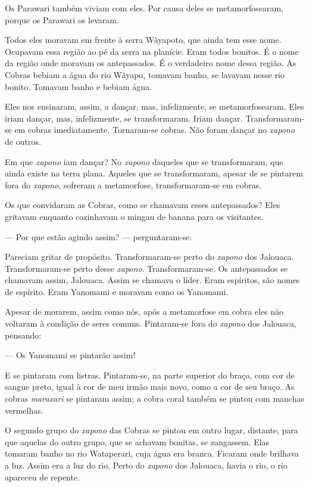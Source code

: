 Os Parawari também viviam com eles. Por causa deles se metamorfosearam,
porque os Parawari os levaram. 

Todos eles moravam em frente à serra Wãyapoto, que ainda tem esse nome.
Ocupavam essa região ao pé da serra na planície. Eram todos bonitos. É o
nome da região onde moravam os antepassados. É o verdadeiro nome dessa
região. As Cobras bebiam a água do rio Wãyapo, tomavam banho, se lavavam
nesse rio bonito. Tomavam banho e bebiam água. 

Eles nos ensinaram, assim, a dançar, mas, infelizmente, se
metamorfosearam. Eles iriam dançar, mas, infelizmente, se transformaram.
Iriam dançar. Transformaram-se em cobras imediatamente. Tornaram-se
cobras. Não foram dançar no \textit{xapono} de outros. 

Em que \textit{xapono} iam dançar? No \textit{xapono} daqueles que se transformaram, que ainda existe na terra plana. Aqueles que se transformaram, apesar de se
pintarem fora do \textit{xapono}, sofreram a metamorfose, transformaram-se em
cobras. 

Os que convidaram as Cobras, como se chamavam esses antepassados? Eles
gritavam enquanto cozinhavam o mingau de banana para os visitantes. 

--- Por que estão agindo assim? --- perguntaram-se.

Pareciam gritar de propósito. Transformaram-se perto do \textit{xapono} dos
Jalouaca. Transformaram-se perto desse \textit{xapono}. Transformaram-se. Os
antepassados se chamavam assim, Jalouaca. Assim se chamava o líder. Eram
espíritos, são nomes de espírito. Eram Yanomami e moravam como os
Yanomami. 

Apesar de morarem, 
assim como nós, após a metamorfose em cobra eles não
voltaram à condição de seres comuns. Pintaram-se fora do \textit{xapono} dos
Jalouaca, pensando: 

--- Os Yanomami se pintarão assim! 

E se pintaram com listras. Pintaram-se, na parte superior do braço, com
cor de sangue preto, igual à cor de meu irmão mais novo, como a cor de
seu braço. As cobras \textit{maraxari} se pintaram assim; a cobra coral
também se pintou com manchas vermelhas. 

O segundo grupo do \textit{xapono} das Cobras se pintou em outro lugar, distante,
para que aquelas do outro grupo, que se achavam bonitas, se zangassem.
Elas tomaram banho no rio Wataperari, cuja água era branca. Ficaram onde
brilhava a luz. Assim era a luz do rio. Perto do \textit{xapono} dos Jalouaca,
havia o rio, o rio apareceu de repente. 

